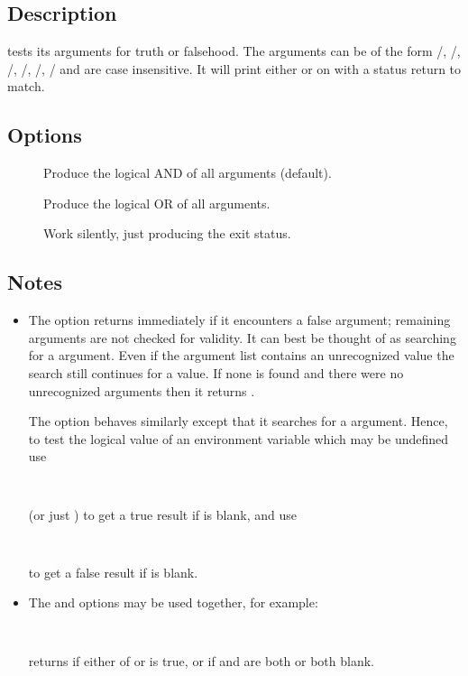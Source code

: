 \subsection*{Description}

 tests its arguments for truth or falsehood.  The arguments can be
of the form /, /, /,
/, /, / and are case
insensitive.  It will print either  or  on
 with a status return to match.

\subsection*{Options}

\begin{description}
\item[]
   Produce the logical AND of all arguments (default).

\item[]
   Produce the logical  OR of all arguments.

\item[]
   Work silently, just producing the exit status.
\end{description}

\subsection*{Notes}

\begin{itemize}
\item
   The  option returns immediately if it encounters a false argument;
   remaining arguments are not checked for validity.  It can best be thought
   of as searching for a  argument.  Even if the argument list
   contains an unrecognized value the search still continues for a
    value.  If none is found and there were no unrecognized
   arguments then it returns .

   The  option behaves similarly except that it searches for a
    argument.  Hence, to test the logical value of an environment
   variable which may be undefined use

   \verb+   +

   \noindent
   (or just ) to get a true result if  is blank,
   and use

   \verb+   +

   \noindent
   to get a false result if  is blank.

\item
   The  and  options may be used together, for example:

   \verb+   +

   \noindent
   returns  if either of  or  is true, or if
    and  are both  or both blank.
\end{itemize}

